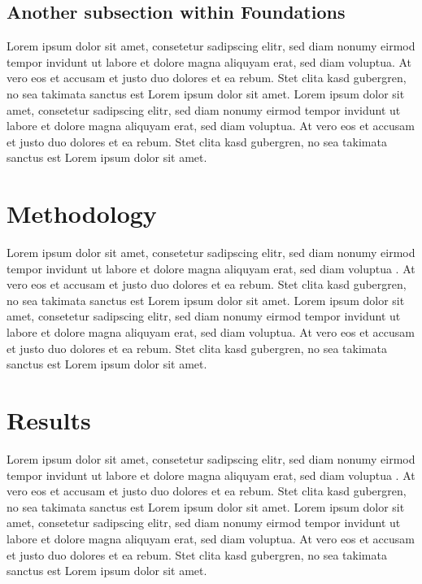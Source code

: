 \documentclass[a4paper]{article}
\begin{document}
\subsection{Another subsection within Foundations} %
\label{sub:another_subsection_within_foundations}
Lorem ipsum dolor sit amet, consetetur sadipscing elitr, sed diam nonumy eirmod tempor invidunt ut labore et dolore magna aliquyam erat, sed diam voluptua. At vero eos et accusam et justo duo dolores et ea rebum. Stet clita kasd gubergren, no sea takimata sanctus est Lorem ipsum dolor sit amet. Lorem ipsum dolor sit amet, consetetur sadipscing elitr, sed diam nonumy eirmod tempor invidunt ut labore et dolore magna aliquyam erat, sed diam voluptua. At vero eos et accusam et justo duo dolores et ea rebum. Stet clita kasd gubergren, no sea takimata sanctus est Lorem ipsum dolor sit amet.



\section{Methodology} %
\label{sec:methodology}
Lorem ipsum dolor sit amet, consetetur sadipscing elitr, sed diam nonumy eirmod tempor invidunt ut labore et dolore magna aliquyam erat, sed diam voluptua \citep{Dix04}. At vero eos et accusam et justo duo dolores et ea rebum. Stet clita kasd gubergren, no sea takimata sanctus est Lorem ipsum dolor sit amet. Lorem ipsum dolor sit amet, consetetur sadipscing elitr, sed diam nonumy eirmod tempor invidunt ut labore et dolore magna aliquyam erat, sed diam voluptua. At vero eos et accusam et justo duo dolores et ea rebum. Stet clita kasd gubergren, no sea takimata sanctus est Lorem ipsum dolor sit amet.

\section{Results} %
\label{sec:results}
Lorem ipsum dolor sit amet, consetetur sadipscing elitr, sed diam nonumy eirmod tempor invidunt ut labore et dolore magna aliquyam erat, sed diam voluptua \citep[p. 48]{Baddeley:1974ts}. At vero eos et accusam et justo duo dolores et ea rebum. Stet clita kasd gubergren, no sea takimata sanctus est Lorem ipsum dolor sit amet. Lorem ipsum dolor sit amet, consetetur sadipscing elitr, sed diam nonumy eirmod tempor invidunt ut labore et dolore magna aliquyam erat, sed diam voluptua. At vero eos et accusam et justo duo dolores et ea rebum. Stet clita kasd gubergren, no sea takimata sanctus est Lorem ipsum dolor sit amet.
\end{document}
